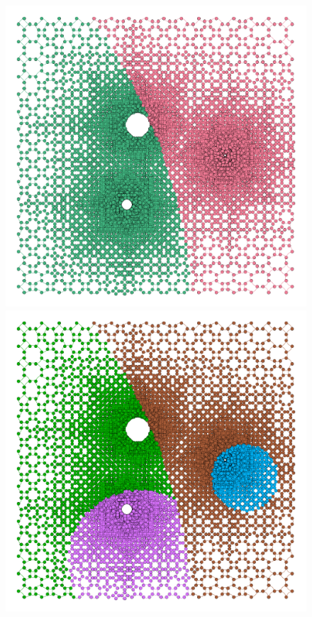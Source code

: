 \documentclass[a4paper,10pt]{article}
\begin{document}
\begin{figure}
\includegraphics[scale=0.2]{slowrot_RecursiveKMeans_k2}
\includegraphics[scale=0.2]{slowrot_RecursiveKMeans_k4}


\end{figure}
\end{document}
